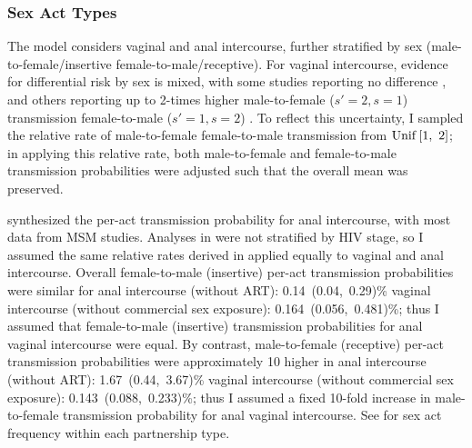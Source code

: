 \subsubsection{Sex Act Types}\label{model.par.beta.sex}
The model considers vaginal and anal intercourse,
further stratified by sex (male-to-female/insertive \vs female-to-male/receptive).
For vaginal intercourse, evidence for differential risk by sex is mixed,
with some studies reporting no difference \cite{Wawer2005,Hughes2012},
and others reporting up to 2-times higher male-to-female ($s'=2,s=1$) transmission
\vs female-to-male ($s'=1,s=2$) \cite{Gregson2002a,Boily2009}.
To reflect this uncertainty, I sampled
the relative rate of male-to-female \vs female-to-male transmission from $\operatorname{Unif}\,[1,~2]$;
in applying this relative rate, both male-to-female and female-to-male transmission probabilities
were adjusted such that the overall mean was preserved.
\par
\citet{Baggaley2018} synthesized the per-act transmission probability for anal intercourse,
with most data from MSM studies.
Analyses in \cite{Baggaley2018} were not stratified by HIV stage,
so I assumed the same relative rates derived in 
applied equally to vaginal and anal intercourse.
Overall female-to-male (insertive) per-act transmission probabilities were similar for
anal intercourse \cite{Baggaley2013} (without ART): 0.14~(0.04,~0.29)\% \vs
vaginal intercourse \cite{Boily2009} (without commercial sex exposure): 0.164~(0.056,~0.481)\%;
thus I assumed that female-to-male (insertive) transmission probabilities
for anal \vs vaginal intercourse were equal.
By contrast, male-to-female (receptive) per-act transmission probabilities were approximately 10 higher
in anal intercourse \cite{Baggaley2018} (without ART): 1.67~(0.44,~3.67)\% \vs
vaginal intercourse \cite{Boily2009} (without commercial sex exposure): 0.143~(0.088,~0.233)\%;
thus I assumed a fixed 10-fold increase in male-to-female transmission probability
for anal \vs vaginal intercourse.
See  for sex act frequency within each partnership type.
